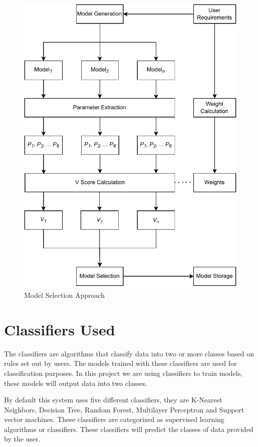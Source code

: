 \begin{figure}
  \centering
  \includegraphics[width=0.9\columnwidth]{media/architecture/math_model_relaxed.pdf}
  \caption{Model Selection Approach}
  \label{fig:model_selection_approach}
\end{figure}

\section{Classifiers Used} \label{sec:supervised_learning}

The classifiers are algorithms that classify data into two or more classes based on rules set out by users. The models trained with these classifiers are used for classification purposes. In this project we are using classifiers to train models, these models will output data into two classes.

By default this system uses five different classifiers, they are K-Nearest Neighbors, Decision Tree, Random Forest, Multilayer Perceptron and Support vector machines. These classifiers are categorized as supervised learning algorithms or classifiers. These classifiers will predict the classes of data provided by the user.

